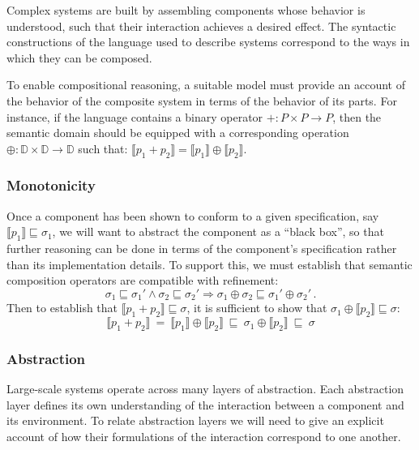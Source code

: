 \documentclass[acmsmall,timestamp,review,anonymous]{acmart}
\begin{document}
Complex systems are built by assembling components
whose behavior is understood,
such that their interaction achieves a desired effect.
The syntactic constructions of
the language used to describe systems
correspond to the ways in which they can be composed.

To enable compositional reasoning,
a suitable model must provide an account of
the behavior of the composite system
in terms of the behavior of its parts.
For instance,
if the language contains a binary operator
${+} : P \times P \rightarrow P$,
then the semantic domain should be equipped with
a corresponding operation
${\oplus} : \mathbb{D} \times \mathbb{D} \rightarrow \mathbb{D}$
such that:
$\llbracket p_1 + p_2 \rrbracket =
 \llbracket p_1 \rrbracket \oplus \llbracket p_2 \rrbracket$.


\subsubsection{Monotonicity} %

Once a component has been shown to conform to a given specification,
say $\llbracket p_1 \rrbracket \sqsubseteq \sigma_1$,
we will want to abstract the component as a ``black box'',
so that further reasoning can be done in terms of
the component's specification rather than its implementation details.
To support this,
we must establish that semantic composition operators
are compatible with refinement:
\[ \sigma_1 \sqsubseteq \sigma_1' \wedge
   \sigma_2 \sqsubseteq \sigma_2' \Rightarrow
   \sigma_1 \oplus \sigma_2 \sqsubseteq \sigma_1' \oplus \sigma_2' \,. \]
Then to establish that
$\llbracket p_1 + p_2 \rrbracket \sqsubseteq \sigma$,
it is sufficient to show that
$\sigma_1 \oplus \llbracket p_2 \rrbracket \sqsubseteq \sigma$:
\[
   \llbracket p_1 + p_2 \rrbracket \: = \:
   \llbracket p_1 \rrbracket \oplus \llbracket p_2 \rrbracket \:\sqsubseteq\:
   \sigma_1 \oplus \llbracket p_2 \rrbracket \:\sqsubseteq\:
   \sigma
\]


\subsubsection{Abstraction} %

Large-scale systems operate across many layers of abstraction.
Each abstraction layer defines its own understanding of the interaction
between a component and its environment.
To relate abstraction layers we will need to give an explicit account
of how their formulations of the interaction correspond to one another.
\end{document}
